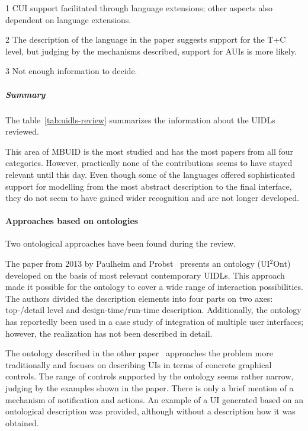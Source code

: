\begin{table}[]
\begin{threeparttable}[b]
\begin{tabularx}{\textwidth}{lrCCC}
            \bottomrule
        \end{tabularx}
        \begin{tablenotes}
            \item[1] CUI support facilitated through language extensions;
                     other aspects also dependent on language extensions.
            \item[2] The description of the language in the paper suggests support for the T+C level, but judging by the mechanisms described, support for AUIs is more likely.
            \item[3] Not enough information to decide.
        \end{tablenotes}
    \end{threeparttable}
\end{table}

\subparagraph{Summary}
The table~\ref{tab:uidls-review} summarizes the information about the UIDLs reviewed.

This area of MBUID is the most studied and has the most papers from all four categories.
However, practically none of the contributions seems to have stayed relevant until this day.
Even though some of the languages offered sophisticated support for modelling from the most abstract description to the final interface, they do not seem to have gained wider recognition and are not longer developed.

\paragraph{Approaches based on ontologies}

Two ontological approaches have been found during the review.

The paper from 2013 by Paulheim and Probst~\cite{paulheim_ui2ont_2013} presents an ontology (UI$^{2}$Ont) developed on the basis of most relevant contemporary UIDLs.
This approach made it possible for the ontology to cover a wide range of interaction possibilities.
The authors divided the description elements into four parts on two axes: top-/detail level and design-time/run-time description.
Additionally, the ontology has reportedly been used in a case study of integration of multiple user interfaces;
however, the realization has not been described in detail.

The ontology described in the other paper~\cite{wysota_semantic_2015} approaches the problem more traditionally and focuses on describing UIs in terms of concrete graphical controls.
The range of controls supported by the ontology seems rather narrow, judging by the examples shown in the paper.
There is only a brief mention of a mechanism of notification and actions.
An example of a UI generated based on an ontological description was provided, although without a description how it was obtained.

